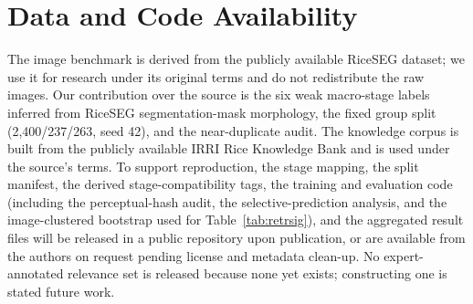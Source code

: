 \documentclass[conference]{IEEEtran}
\begin{document}
\section{Data and Code Availability}
\label{sec:availability}

The image benchmark is derived from the publicly available RiceSEG dataset; we use it for research under its original terms and do not redistribute the raw images. Our contribution over the source is the six weak macro-stage labels inferred from RiceSEG segmentation-mask morphology, the fixed group split (2{,}400/237/263, seed 42), and the near-duplicate audit. The knowledge corpus is built from the publicly available IRRI Rice Knowledge Bank and is used under the source's terms. To support reproduction, the stage mapping, the split manifest, the derived stage-compatibility tags, the training and evaluation code (including the perceptual-hash audit, the selective-prediction analysis, and the image-clustered bootstrap used for Table~\ref{tab:retrsig}), and the aggregated result files will be released in a public repository upon publication, or are available from the authors on request pending license and metadata clean-up. No expert-annotated relevance set is released because none yet exists; constructing one is stated future work.



\end{document}
